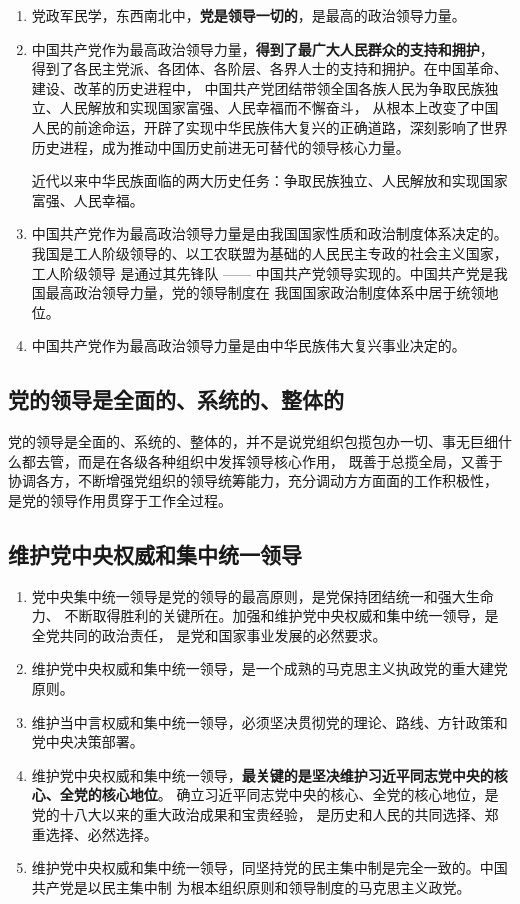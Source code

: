 \documentclass[UTF8,10pt]{ctexbook} %
\begin{document}
\begin{enumerate}[itemsep=0pt]
    \item 党政军民学，东西南北中，\textbf{党是领导一切的}，是最高的政治领导力量。
    \item 中国共产党作为最高政治领导力量，\textbf{得到了最广大人民群众的支持和拥护}，
    得到了各民主党派、各团体、各阶层、各界人士的支持和拥护。在中国革命、建设、改革的历史进程中，
    中国共产党团结带领全国各族人民为争取民族独立、人民解放和实现国家富强、人民幸福而不懈奋斗，
    从根本上改变了中国人民的前途命运，开辟了实现中华民族伟大复兴的正确道路，深刻影响了世界
    历史进程，成为推动中国历史前进无可替代的领导核心力量。
    \begin{remark}
        近代以来中华民族面临的两大历史任务：争取民族独立、人民解放和实现国家富强、人民幸福。
    \end{remark}
    \item 中国共产党作为最高政治领导力量是由我国国家性质和政治制度体系决定的。
    我国是工人阶级领导的、以工农联盟为基础的人民民主专政的社会主义国家，工人阶级领导
    是通过其先锋队 —— 中国共产党领导实现的。中国共产党是我国最高政治领导力量，党的领导制度在
    我国国家政治制度体系中居于统领地位。
    \item 中国共产党作为最高政治领导力量是由中华民族伟大复兴事业决定的。
\end{enumerate}

\subsection{党的领导是全面的、系统的、整体的}

党的领导是全面的、系统的、整体的，并不是说党组织包揽包办一切、事无巨细什么都去管，而是在各级各种组织中发挥领导核心作用，
既善于总揽全局，又善于协调各方，不断增强党组织的领导统筹能力，充分调动方方面面的工作积极性，
是党的领导作用贯穿于工作全过程。

\subsection{维护党中央权威和集中统一领导}

\begin{enumerate}[itemsep=0pt]
    \item 党中央集中统一领导是党的领导的最高原则，是党保持团结统一和强大生命力、
    不断取得胜利的关键所在。加强和维护党中央权威和集中统一领导，是全党共同的政治责任，
    是党和国家事业发展的必然要求。
    \item 维护党中央权威和集中统一领导，是一个成熟的马克思主义执政党的重大建党原则。
    \item 维护当中言权威和集中统一领导，必须坚决贯彻党的理论、路线、方针政策和党中央决策部署。
    \item 维护党中央权威和集中统一领导，\textbf{最关键的是坚决维护习近平同志党中央的核心、全党的核心地位}。
    确立习近平同志党中央的核心、全党的核心地位，是党的十八大以来的重大政治成果和宝贵经验，
    是历史和人民的共同选择、郑重选择、必然选择。
    \item 维护党中央权威和集中统一领导，同坚持党的民主集中制是完全一致的。中国共产党是以民主集中制
    为根本组织原则和领导制度的马克思主义政党。
\end{enumerate}
\end{document}
